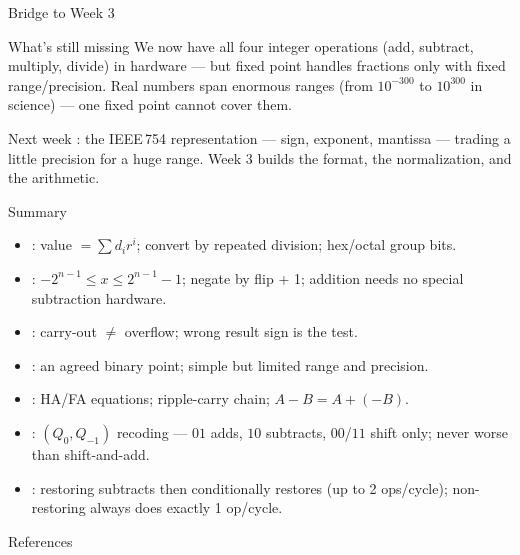 \documentclass[aspectratio=169]{beamer}
\begin{document}
\begin{frame}{Bridge to Week 3}
  \begin{block}{What's still missing}
    We now have all four integer operations (add, subtract, multiply, divide)
    in hardware --- but fixed point handles fractions only with fixed
    range/precision. Real numbers span enormous ranges (from $10^{-300}$ to
    $10^{300}$ in science) --- one fixed point cannot cover them.
  \end{block}
  \begin{exampleblock}{Next week}
    : the IEEE\,754 representation --- sign, exponent,
    mantissa --- trading a little precision for a huge range. Week 3 builds the
    format, the normalization, and the arithmetic.
  \end{exampleblock}
\end{frame}

\begin{frame}{Summary}
  \begin{itemize}
    \item {}: value $= \sum d_i r^i$; convert by repeated
      division; hex/octal group bits.
    \item {}: $-2^{n-1} \le x \le 2^{n-1}-1$; negate by
      flip + 1; addition needs no special subtraction hardware.
    \item {}: carry-out $\neq$ overflow; wrong result sign is the
      test.
    \item {}: an agreed binary point; simple but limited range
      and precision.
    \item {}: HA/FA equations; ripple-carry chain; $A-B = A+(-B)$.
    \item {}: $(Q_0,Q_{-1})$ recoding --- $01$ adds,
      $10$ subtracts, $00$/$11$ shift only; never worse than shift-and-add.
    \item {}: restoring subtracts then conditionally restores
      (up to 2 ops/cycle); non-restoring always does exactly 1 op/cycle.
  \end{itemize}
\end{frame}

\begin{frame}{References}
  \footnotesize
  
  
\end{frame}
\end{document}
